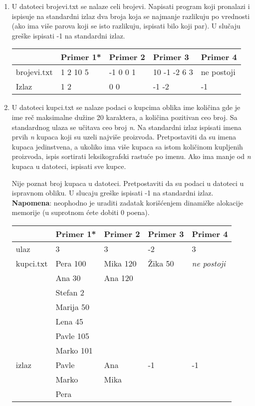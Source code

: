 \begin{enumerate}
\item
U datoteci brojevi.txt se nalaze celi brojevi. Napisati program
koji pronalazi i ispisuje na standardni izlaz dva broja koja se najmanje razlikuju po vrednosti (ako ima vi\v se parova koji se isto razlikuju, ispisati bilo koji par). U slu\v caju gre\v ske ispisati -1 na standardni izlaz.

\small
\begin{tabular}{ |l|l|l|l|l| }
\hline
   & Primer 1* &  Primer 2 &  Primer 3 &  Primer 4 \\ \hline
  brojevi.txt  & 1 2 10 5 & -1 0 0 1 & 10 -1 -2 6 3 & ne postoji \\ \hline
  Izlaz & 1 2 & 0 0 & -1 -2 & -1 \\ \hline
\end{tabular}
\normalsize

\item U datoteci kupci.txt se nalaze podaci o kupcima oblika ime koli\v cina gde je ime re\v c maksimalne du\v zine 20 karaktera, a koli\v cina pozitivan ceo broj. Sa standardnog ulaza se u\v citava ceo broj \emph{n}. Na standardni izlaz ispisati imena prvih \emph{n} kupaca koji su uzeli najvi\v se proizvoda. Pretpostaviti da su imena kupaca jedinstvena, a ukoliko ima vi\v se kupaca sa istom koli\v cinom kupljenih proizvoda, ispis sortirati leksikografski rastu\' ce po imenu. Ako ima manje od \emph{n} kupaca u datoteci, ispisati sve kupce.    

Nije poznat broj kupaca u datoteci. Pretpostaviti da su podaci u datoteci u ispravnom obliku. U slucaju gre\v ske ispisati -1 na standardni izlaz. \\
\textbf{Napomena}: neophodno je uraditi zadatak kori\v s\' cenjem dinami\v cke alokacije memorije (u suprotnom \' cete dobiti 0 poena).

\small
\begin{tabular}{ |l|l|l|l|l| }
\hline
  & Primer 1* &  Primer 2 &  Primer 3 &  Primer 4 \\ \hline
  ulaz & 3 & 3 & -2 & 3 \\ \hline
  kupci.txt & Pera 100 & Mika 120 & \v Zika 50 & \emph{ne postoji}\\
          & Ana 30 & Ana 120 & & \\
          & Stefan 2 & & &  \\
          & Marija 50 & & &  \\
          & Lena 45 & & &  \\
          & Pavle 105 & & &  \\
          & Marko 101 & & &  \\ \hline
  izlaz &Pavle  & Ana &-1& -1 \\
         & Marko &Mika & &  \\
         & Pera & & &  \\ \hline
\end{tabular}
\normalsize



\end{enumerate}
